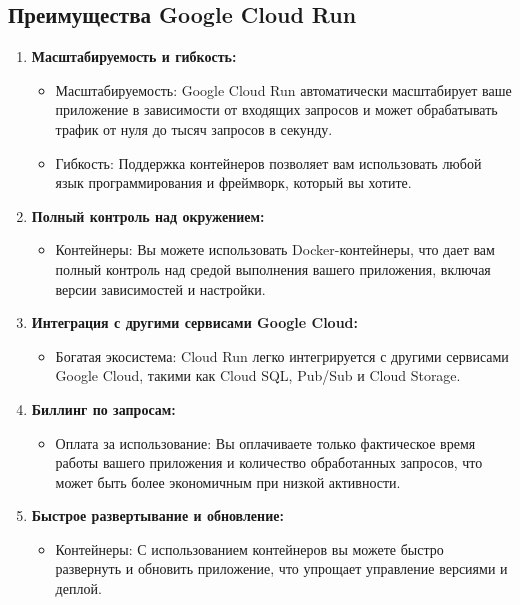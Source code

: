 \documentclass[
]{book}
\providecommand{\tightlist}{%
  \setlength{\itemsep}{0pt}\setlength{\parskip}{0pt}}
\begin{document}
\subsection{Преимущества Google Cloud Run}\label{ux43fux440ux435ux438ux43cux443ux449ux435ux441ux442ux432ux430-google-cloud-run}

\begin{enumerate}
\def\labelenumi{\arabic{enumi}.}
\tightlist
\item
  \textbf{Масштабируемость и гибкость:}

  \begin{itemize}
  \tightlist
  \item
    Масштабируемость: Google Cloud Run автоматически масштабирует ваше приложение в зависимости от входящих запросов и может обрабатывать трафик от нуля до тысяч запросов в секунду.
  \item
    Гибкость: Поддержка контейнеров позволяет вам использовать любой язык программирования и фреймворк, который вы хотите.
  \end{itemize}
\item
  \textbf{Полный контроль над окружением:}

  \begin{itemize}
  \tightlist
  \item
    Контейнеры: Вы можете использовать Docker-контейнеры, что дает вам полный контроль над средой выполнения вашего приложения, включая версии зависимостей и настройки.
  \end{itemize}
\item
  \textbf{Интеграция с другими сервисами Google Cloud:}

  \begin{itemize}
  \tightlist
  \item
    Богатая экосистема: Cloud Run легко интегрируется с другими сервисами Google Cloud, такими как Cloud SQL, Pub/Sub и Cloud Storage.
  \end{itemize}
\item
  \textbf{Биллинг по запросам:}

  \begin{itemize}
  \tightlist
  \item
    Оплата за использование: Вы оплачиваете только фактическое время работы вашего приложения и количество обработанных запросов, что может быть более экономичным при низкой активности.
  \end{itemize}
\item
  \textbf{Быстрое развертывание и обновление:}

  \begin{itemize}
  \tightlist
  \item
    Контейнеры: С использованием контейнеров вы можете быстро развернуть и обновить приложение, что упрощает управление версиями и деплой.
  \end{itemize}
\end{enumerate}
\end{document}
